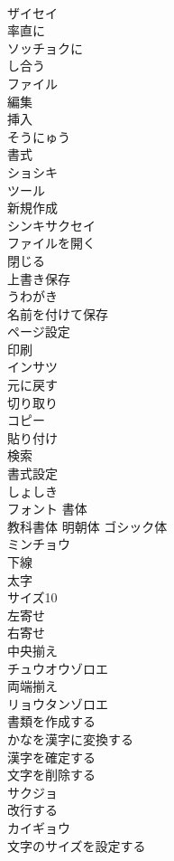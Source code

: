 \documentclass[8pt]{extreport}
\begin{document}
\begin{CJK}{UTF8}{min}
\\	ザイセイ
\\	率直に	
\\	ソッチョクに
\\	し合う	
\\	ファイル	
\\	編集	
\\	挿入	
\\	そうにゅう
\\	書式	
\\	ショシキ
\\	ツール	
\\	新規作成	
\\	シンキサクセイ
\\	ファイルを開く 
\\	閉じる	
\\	上書き保存	
\\	うわがき
\\	名前を付けて保存	
\\	ページ設定	
\\	印刷	
\\	インサツ
\\	元に戻す	
\\	切り取り	
\\	コピー	
\\	貼り付け	
\\	検索	
\\	書式設定	
\\	しょしき
\\	フォント 書体	
\\	教科書体 明朝体 ゴシック体	
\\	ミンチョウ
\\	下線	
\\	太字	
\\	サイズ10
\\	左寄せ	
\\	右寄せ	
\\	中央揃え	
\\	チュウオウゾロエ
\\	両端揃え	
\\	リョウタンゾロエ
\\	書類を作成する	
\\	かなを漢字に変換する	
\\	漢字を確定する	
\\	文字を削除する	
\\	サクジョ
\\	改行する	
\\	カイギョウ
\\	文字のサイズを設定する	

\end{CJK}
\end{document}
